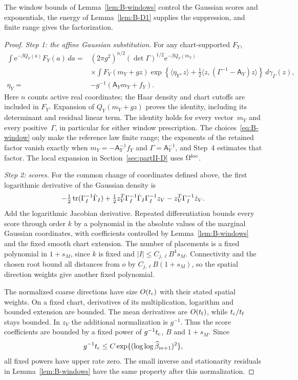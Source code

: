 The window bounds of Lemma~\ref{lem:B-windows} control the Gaussian scores and exponentials, the energy of Lemma~\ref{lem:B-D1} supplies the suppression, and finite range gives the factorization.
\begin{proof}
\emph{Step 1: the affine Gaussian substitution.} For any chart-supported $F_Y$,
\begin{align*}
\int \mathrm e^{-\beta Q_Y(a)}F_Y(a)\,da
={}&(2\pi g^2)^{n/2}(\det\Gamma)^{1/2}\mathrm e^{-\beta Q_Y(m_Y)}\\
&\times\int F_Y(m_Y+gz)
 \exp\left\{\langle\eta_Y,z\rangle+\tfrac12\langle z,(\Gamma^{-1}-\mathsf A_Y)z\rangle\right\}\,d\gamma_\Gamma(z),\\
\eta_Y={}&-g^{-1}(\mathsf A_Ym_Y+f_Y).
\end{align*}
Here $n$ counts active real coordinates; the Haar density and chart cutoffs are included in $F_Y$. Expansion of $Q_Y(m_Y+gz)$ proves the identity, including its determinant and residual linear term. The identity holds for every vector~$m_Y$ and every positive~$\Gamma$, in particular for either window prescription. The choices~\eqref{eq:B-window} only make the reference law finite range; the exponents of the retained factor vanish exactly when $m_Y=-\mathsf A_Y^{-1}f_Y$ and $\Gamma=\mathsf A_Y^{-1}$, and Step~4 estimates that factor. The local expansion in Section~\ref{sec:partII-D} uses $\Omega^{\rm loc}$.

\emph{Step 2: scores.} For the common change of coordinates defined above, the first logarithmic derivative of the Gaussian density is
\begin{equation*}
-\tfrac12\operatorname{tr}(\Gamma_I^{-1}\dot \Gamma_I)
+\tfrac12z_V^T\Gamma_I^{-1}\dot \Gamma_I\Gamma_I^{-1}z_V
-z_V^T\Gamma_I^{-1}\dot z_V.
\end{equation*}
Add the logarithmic Jacobian derivative. Repeated differentiation bounds every score through order $k$ by a polynomial in the absolute values of the marginal Gaussian coordinates, with coefficients controlled by Lemma~\ref{lem:B-windows} and the fixed smooth chart extension. The number of placements is a fixed polynomial in $1+s_M$, since $k$ is fixed and $|I|\le C_{j,\ell}B^4s_M$. Connectivity and the chosen root bound all distances from $o$ by $C_{j,\ell}B(1+s_M)$, so the spatial direction weights give another fixed polynomial.

The normalized coarse directions have size $O(t_{\rm c})$ with their stated spatial weights. On a fixed chart, derivatives of its multiplication, logarithm and bounded extension are bounded. The mean derivatives are $O(t_{\rm f})$, while $t_{\rm c}/t_{\rm f}$ stays bounded. In $z_V$ the additional normalization is $g^{-1}$. Thus the score coefficients are bounded by a fixed power of $g^{-1}t_{\rm c}$, $B$ and $1+s_M$. Since
\begin{equation*}
g^{-1}t_{\rm c}\le C\exp\{(\log\log\widehat{\beta}_{m+1})^2\},
\end{equation*}
all fixed powers have upper rate zero. The small inverse and stationarity residuals in Lemma~\ref{lem:B-windows} have the same property after this normalization.


\end{proof}
